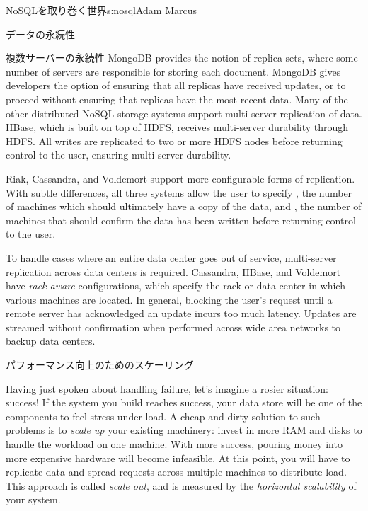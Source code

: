 \begin{aosachapter}{NoSQLを取り巻く世界}{s:nosql}{Adam Marcus}
\begin{aosasect1}{データの永続性}
\begin{aosasect2}{複数サーバーの永続性}
MongoDB provides the notion of replica sets, where some number of
servers are responsible for storing each document.  MongoDB gives
developers the option of ensuring that all replicas have received
updates, or to proceed without ensuring that replicas have the most
recent data.  Many of the other distributed NoSQL storage systems
support multi-server replication of data.  HBase, which is built on
top of HDFS, receives multi-server durability through HDFS\@.  All
writes are replicated to two or more HDFS nodes before returning
control to the user, ensuring multi-server durability.

Riak, Cassandra, and Voldemort support more configurable forms of
replication.  With subtle differences, all three systems allow the
user to specify , the number of machines which should
ultimately have a copy of the data, and ,
the number of machines that should confirm the data has been written
before returning control to the user.

To handle cases where an entire data center goes out of service,
multi-server replication across data centers is required.  Cassandra,
HBase, and Voldemort have \emph{rack-aware} configurations, which
specify the rack or data center in which various machines are located.
In general, blocking the user's request until a remote server has
acknowledged an update incurs too much latency. Updates are streamed
without confirmation when performed across wide area networks to
backup data centers.

\end{aosasect2}

\end{aosasect1}

\begin{aosasect1}{パフォーマンス向上のためのスケーリング}

Having just spoken about handling failure, let's imagine a rosier
situation: success!  If the system you build reaches success, your
data store will be one of the components to feel stress under load.  A
cheap and dirty solution to such problems is to \emph{scale up} your
existing machinery: invest in more RAM and disks to handle the
workload on one machine.  With more success, pouring money into more
expensive hardware will become infeasible.  At this point, you will
have to replicate data and spread requests across multiple machines to
distribute load.  This approach is called \emph{scale out}, and is
measured by the \emph{horizontal scalability} of your system.


\end{aosasect1}
\end{aosachapter}
